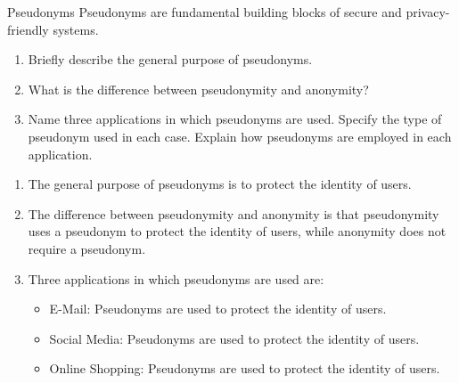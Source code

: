 \documentclass{article}
\begin{document}
\begin{exercise}{Pseudonyms}
  Pseudonyms are fundamental building blocks of secure and privacy-friendly systems.
  \begin{enumerate}
    \item Briefly describe the general purpose of pseudonyms.
    \item What is the difference between pseudonymity and anonymity?
    \item Name three applications in which pseudonyms are used. Specify the type of pseudonym used in each case. Explain how pseudonyms are employed in each application.
  \end{enumerate}

  \begin{solution}
    \begin{enumerate}
      \item The general purpose of pseudonyms is to protect the identity of users.
      \item The difference between pseudonymity and anonymity is that pseudonymity uses a pseudonym to protect the identity of users, while anonymity does not require a pseudonym.
      \item Three applications in which pseudonyms are used are:
        \begin{itemize}
          \item E-Mail: Pseudonyms are used to protect the identity of users.
          \item Social Media: Pseudonyms are used to protect the identity of users.
          \item Online Shopping: Pseudonyms are used to protect the identity of users.
        \end{itemize}
    \end{enumerate}
  \end{solution}
\end{exercise}
\end{document}
